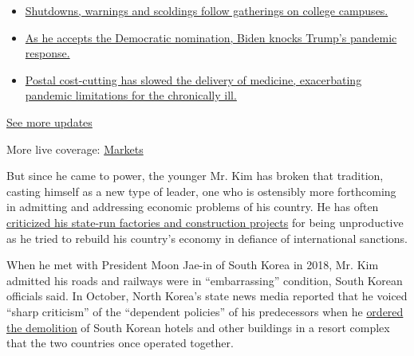 \begin{itemize}
\tightlist
\item
  \href{https://www.nytimes3xbfgragh.onion/2020/08/21/world/covid-19-coronavirus.html?action=click\&pgtype=Article\&state=default\&region=MAIN_CONTENT_1\&context=storylines_live_updates\#link-4690b6aa}{Shutdowns,
  warnings and scoldings follow gatherings on college campuses.}
\item
  \href{https://www.nytimes3xbfgragh.onion/2020/08/21/world/covid-19-coronavirus.html?action=click\&pgtype=Article\&state=default\&region=MAIN_CONTENT_1\&context=storylines_live_updates\#link-324af071}{As
  he accepts the Democratic nomination, Biden knocks Trump's pandemic
  response.}
\item
  \href{https://www.nytimes3xbfgragh.onion/2020/08/21/world/covid-19-coronavirus.html?action=click\&pgtype=Article\&state=default\&region=MAIN_CONTENT_1\&context=storylines_live_updates\#link-1c47e0d0}{Postal
  cost-cutting has slowed the delivery of medicine, exacerbating
  pandemic limitations for the chronically ill.}
\end{itemize}

\href{https://www.nytimes3xbfgragh.onion/2020/08/21/world/covid-19-coronavirus.html?action=click\&pgtype=Article\&state=default\&region=MAIN_CONTENT_1\&context=storylines_live_updates}{See
more updates}

More live coverage:
\href{https://www.nytimes3xbfgragh.onion/live/2020/08/20/business/stock-market-today-coronavirus?action=click\&pgtype=Article\&state=default\&region=MAIN_CONTENT_1\&context=storylines_live_updates}{Markets}

But since he came to power, the younger Mr. Kim has broken that
tradition, casting himself as a new type of leader, one who is
ostensibly more forthcoming in admitting and addressing economic
problems of his country. He has often
\href{https://www.nytimes3xbfgragh.onion/2018/08/20/world/asia/kim-jong-un-north-korea-economy-nuclear-talks.html}{criticized
his state-run factories and construction projects} for being
unproductive as he tried to rebuild his country's economy in defiance of
international sanctions.

When he met with President Moon Jae-in of South Korea in 2018, Mr. Kim
admitted his roads and railways were in ``embarrassing'' condition,
South Korean officials said. In October, North Korea's state news media
reported that he voiced ``sharp criticism'' of the ``dependent
policies'' of his predecessors when he
\href{https://www.nytimes3xbfgragh.onion/2019/10/23/world/asia/north-korea-tourism.html}{ordered
the demolition} of South Korean hotels and other buildings in a resort
complex that the two countries once operated together.

